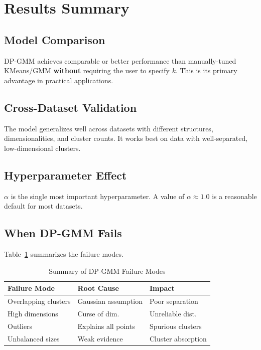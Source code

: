 \documentclass[conference]{IEEEtran}
\begin{document}
\section{Results Summary}

\subsection{Model Comparison}
DP-GMM achieves comparable or better performance than manually-tuned KMeans/GMM \textbf{without} requiring the user to specify $k$. This is its primary advantage in practical applications.

\subsection{Cross-Dataset Validation}
The model generalizes well across datasets with different structures, dimensionalities, and cluster counts. It works best on data with well-separated, low-dimensional clusters.

\subsection{Hyperparameter Effect}
$\alpha$ is the single most important hyperparameter. A value of $\alpha \approx 1.0$ is a reasonable default for most datasets.

\subsection{When DP-GMM Fails}

Table~\ref{tab:failures} summarizes the failure modes.

\begin{table}[h]
\centering
\caption{Summary of DP-GMM Failure Modes}
\label{tab:failures}
\begin{tabular}{@{}lll@{}}
\toprule
\textbf{Failure Mode} & \textbf{Root Cause} & \textbf{Impact} \\
\midrule
Overlapping clusters & Gaussian assumption & Poor separation \\
High dimensions & Curse of dim.\ & Unreliable dist.\ \\
Outliers & Explains all points & Spurious clusters \\
Unbalanced sizes & Weak evidence & Cluster absorption \\
\bottomrule
\end{tabular}
\end{table}
\end{document}
